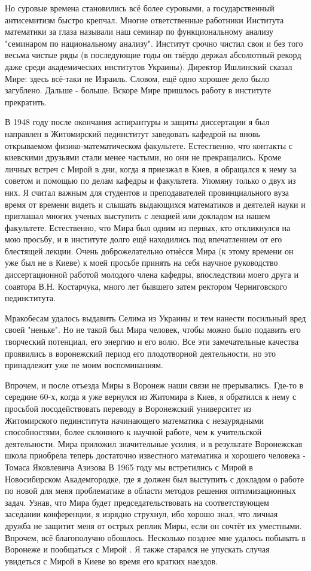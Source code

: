 Но суровые времена становились всё более суровыми, а государственный антисемитизм быстро крепчал. Многие ответственные работники Института математики за глаза называли наш семинар по функциональному анализу "семинаром по национальному анализу". Институт срочно чистил свои и без того весьма чистые ряды (в последующие годы он твёрдо держал абсолютный рекорд даже среди академических институтов Украины). Директор Ишлинский сказал Мире: здесь всё-таки не Израиль. Словом, ещё одно хорошее дело было загублено. Дальше - больше. Вскоре Мире пришлось работу в институте прекратить.

В 1948 году после окончания аспирантуры и защиты диссертации я был направлен в Житомирский пединститут заведовать кафедрой на вновь открываемом физико-математическом факультете. Естественно, что контакты с киевскими друзьями стали менее частыми, но они не прекращались. Кроме личных встреч с Мирой в дни, когда я приезжал в Киев, я обращался к нему за советом и помощью по делам кафедры и факультета. Упомяну только о двух из них. Я считал важным для студентов и преподавателей провинциального вуза время от времени видеть и слышать выдающихся математиков и деятелей науки и приглашал многих ученых выступить с лекцией или докладом на нашем факультете. Естественно, что Мира был одним из первых, кто откликнулся на мою просьбу, и в институте долго ещё находились под впечатлением от его блестящей лекции. Очень доброжелательно отнёсся Мира (к этому времени он уже был не в Киеве) к моей просьбе принять на себя научное руководство диссертационной работой молодого члена кафедры, впоследствии моего друга и соавтора В.Н. Костарчука, много лет бывшего затем ректором Черниговского пединститута.

Мракобесам удалось выдавить Селима из Украины и тем нанести посильный вред своей "неньке". Но не такой был Мира человек, чтобы можно было подавить его творческий потенциал, его энергию и его волю. Все эти замечательные качества проявились в воронежский период его плодотворной деятельности, но это принадлежит уже не моим воспоминаниям.

Впрочем, и после отъезда Миры в Воронеж наши связи не прерывались. Где-то в середине 60-х, когда я уже вернулся из Житомира в Киев, я обратился к нему с просьбой посодействовать переводу в Воронежский университет из Житомирского пединститута начинающего математика с незаурядными способностями, более склонного к научной работе, чем к учительской деятельности. Мира приложил значительные усилия, и в результате Воронежская школа приобрела теперь достаточно известного математика и хорошего человека - Томаса Яковлевича Азизова В 1965 году мы встретились с Мирой в Новосибирском Академгородке, где я должен был выступить с докладом о работе по новой для меня проблематике в области методов решения оптимизационных задач. Узнав, что Мира будет председательствовать на соответствующем заседании конференции, я изрядно струхнул, ибо хорошо знал, что личная дружба не защитит меня от острых реплик Миры, если он сочтёт их уместными. Впрочем, всё благополучно обошлось. Несколько позднее мне удалось побывать в Воронеже и пообщаться с Мирой . Я также старался не упускать случая увидеться с Мирой в Киеве во время его кратких наездов.

